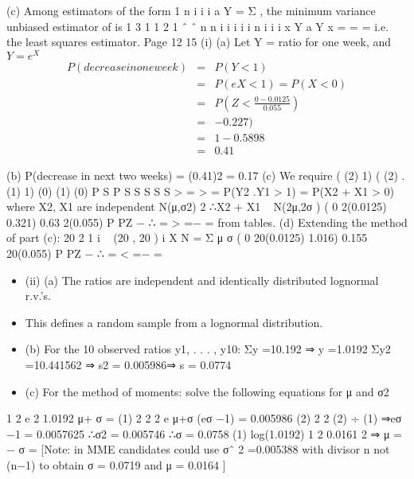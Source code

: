 \documentclass[a4paper,12pt]{article}
\begin{document}
(c) Among estimators of the form 1
n
i i i a Y = Σ , the minimum variance
unbiased estimator of \beta is
1
3 1
1 2
1
ˆ ˆ
n
n i i
i
i i n
i
i
i
x Y
a Y
x
=
=
=
i.e. the least squares estimator.
Page 12
15 (i) (a) Let Y = ratio for one week, and $Y = e^X$
\begin{eqnarray*}
P(decrease in one week) &=& P(Y < 1)\\
&=& P(eX < 1) = P(X < 0)\\
&=& P(Z < \frac{0-0.0125}{0.055})\\
&=& − 0.227) \\ 
&=& 1 − 0.5898 \\ &=& 0.41
\end{eqnarray*}

(b) P(decrease in next two weeks) = (0.41)2 = 0.17
(c) We require ( (2) 1) ( (2) . (1) 1)
(0) (1) (0)
P S P S S
S S S
> = >
= P(Y2 .Y1 > 1) = P(X2 + X1 > 0)
where X2, X1 are independent N(μ,σ2)
2
∴X2 + X1 ~ N(2μ,2σ )
( 0 2(0.0125) 0.321) 0.63
2(0.055)
P PZ −
∴ = > =− = from tables.
(d) Extending the method of part (c):
20
2
1
i ~ (20 , 20 )
i
X N
=
Σ μ σ
( 0 20(0.0125) 1.016) 0.155
20(0.055)
P PZ −
∴ = < =− =
\begin{itemize}
    \item (ii) (a) The ratios are independent and identically distributed lognormal r.v.’s.
\item This defines a random sample from a lognormal distribution.
\item (b) For the 10 observed ratios y1, . . . , y10:
Σy =10.192 ⇒ y =1.0192
Σy2 =10.441562 ⇒ s2 = 0.005986⇒ s = 0.0774
\item (c) For the method of moments:
solve the following equations for μ and σ2
\end{itemize}


1 2
e 2 1.0192
μ+ σ
= (1)
2 2 2 e μ+σ (eσ −1) = 0.005986 (2)
2 2 (2) ÷ (1) ⇒eσ −1 = 0.0057625
∴σ2 = 0.005746 ∴σ = 0.0758
(1) log(1.0192) 1 2 0.0161
2
⇒ μ = − σ =
[Note: in MME candidates could use σˆ 2 =0.005388 with divisor n not
(n−1) to obtain σ = 0.0719 and μ = 0.0164 ]
\end{document}
